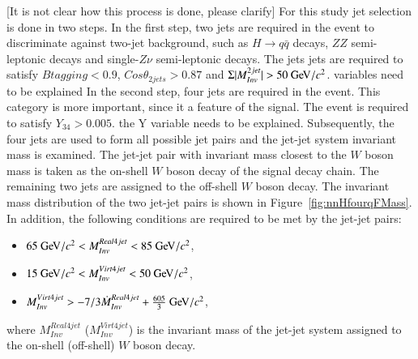 \documentclass[11pt,a4paper]{cepcnote}
\begin{document}
{\color{red}[It is not clear how this process is done, please clarify]}
For this study jet selection is done in two steps. In the first step,
two jets are required in the event to discriminate against 
two-jet background, such as $H\rightarrow q\bar{q}$ decays, 
$ZZ$ semi-leptonic decays and single-$Z\nu$ semi-leptonic decays. 
The jets jets are required to satisfy $Btagging < 0.9$, 
$Cos\theta_{2jets} > 0.87$ and $\Sigma|M_{Inv}^{2jet}| > 50\gev/c^2$. 
{\color{red} variables need to be explained}
In the second step, four jets are required in the event. This category
is more important, since it a feature of the signal. 
The event is required to satisfy  $Y_{34} > 0.005$.
{\color{red} the Y variable needs to be explained}.
Subsequently, the four jets are used to form all possible jet pairs and the
jet-jet system invariant mass is examined. The jet-jet pair with invariant
 mass closest to the $W$ boson mass is taken as the on-shell $W$ boson decay
of the signal decay chain. The remaining two jets are assigned to the
off-shell $W$ boson decay. The invariant mass distribution of the two
jet-jet pairs is shown in Figure~\ref{fig:nnHfourqFMass}.
In addition, the following conditions are required to be met by the jet-jet pairs:
\begin{itemize}
	\item $ 65\gev/c^2 < M_{Inv}^{Real4jet} < 85\gev/c^2$, 
	\item $ 15\gev/c^2 < M_{Inv}^{Virt4jet} < 50\gev/c^2$, 
	\item $ M_{Inv}^{Virt4jet} > -7/3\dot M_{Inv}^{Real4jet} + \frac{605}{3}\gev/c^2$,
\end{itemize}
where $M_{Inv}^{Real4jet}$  ($M_{Inv}^{Virt4jet}$) is the invariant mass of the jet-jet system assigned to the on-shell (off-shell) $W$ boson decay.
\end{document}

